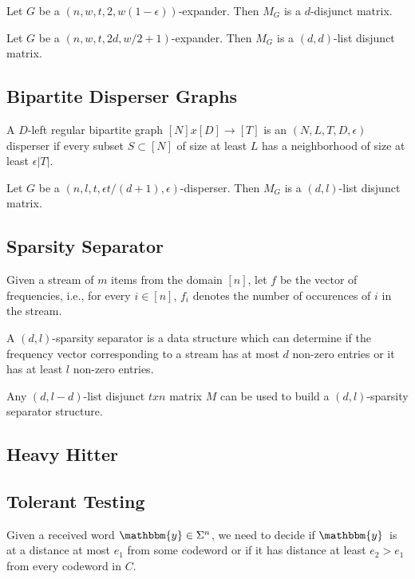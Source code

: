\documentclass{beamer}
\newcommand{\y}{\ensuremath{\mathbbm{y}}}
\begin{document}
\begin{frame}
  Let $G$ be a $(n,w,t,2,w(1-\epsilon))$-expander. Then $M_G$ is a $d$-disjunct matrix.
\end{frame}

\begin{frame}
  Let $G$ be a $(n,w,t,2d,w/2+1)$-expander.
  Then $M_G$ is a $(d,d)$-list disjunct matrix.
\end{frame}

\subsection{Bipartite Disperser Graphs}
\begin{frame}
  A $D$-left regular bipartite graph $[N]x[D] \rightarrow [T]$ is an
  $(N, L, T, D, \epsilon)$ disperser if every subset $S \subset [N]$
  of size at least $L$ has a neighborhood of size at least $\epsilon|T|$.
\end{frame}

\begin{frame}
  Let $G$ be a $(n,l,t,\epsilon t/(d+1),\epsilon)$-disperser.
  Then $M_G$ is a $(d,l)$-list disjunct matrix.
\end{frame}

\subsection{Sparsity Separator}
\begin{frame}
  Given a stream of $m$ items from the domain $[n]$, let $f$ be the vector of
  frequencies, i.e., for every $i \in [n]$, $f_i$ denotes the number of occurences
  of $i$ in the stream.

  A $(d,l)$-sparsity separator is a data structure which can determine if the
  frequency vector corresponding to a stream has at most $d$ non-zero entries
  or it has at least $l$ non-zero entries.
\end{frame}

\begin{frame}
  Any $(d,l-d)$-list disjunct $txn$ matrix $M$ can be used to build a
  $(d,l)$-sparsity separator structure.
\end{frame}

\subsection{Heavy Hitter}

\subsection{Tolerant Testing}
\begin{frame}
  Given a received word $\y \in \Sigma^n$, we need to decide
  if \y\ is at a distance at most $e_1$ from some codeword or
  if it has distance at least $e_2 > e_1$ from every codeword in $C$.
\end{frame}
\end{document}
